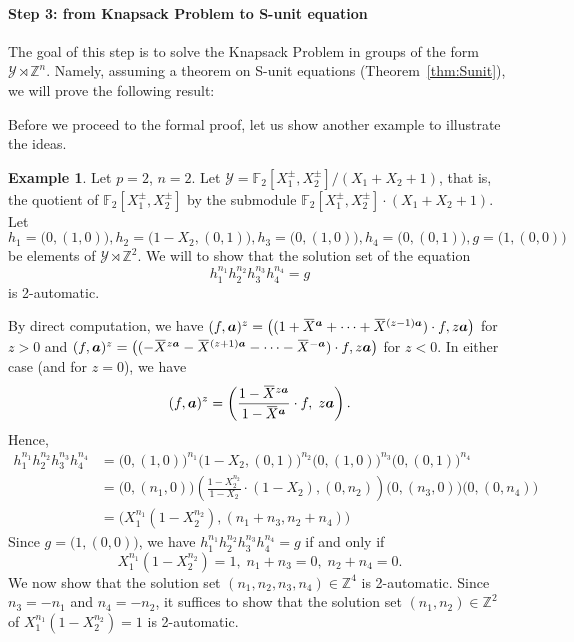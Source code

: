 \documentclass[a4paper,UKenglish,cleveref, autoref, thm-restate]{lipics-v2021}
\newcommand{\Z}{\mathbb{Z}}
\newcommand{\F}{\mathbb{F}}
\newcommand{\mY}{\mathcal{Y}}
\newcommand{\ba}{\boldsymbol{a}}
\newcommand{\oX}{\mkern 1.5mu\overline{\mkern-1.5mu X \mkern-1.5mu}\mkern 1.5mu}
\theoremstyle{definition}
\theoremstyle{definition}
\newtheorem{exmpl}[thrm]{Example}
\theoremstyle{definition}
\begin{document}
\paragraph*{Step 3: from Knapsack Problem to S-unit equation}

The goal of this step is to solve the Knapsack Problem in groups of the form $\mY \rtimes \Z^n$. Namely, assuming a theorem on S-unit equations (Theorem~\ref{thm:Sunit}), we will prove the following result:

\thmKP*

Before we proceed to the formal proof, let us show another example to illustrate the ideas. 

\begin{exmpl}\label{expl:KPtoSunit}
    Let $p = 2$, $n = 2$.
    Let $\mY = \F_2[X_1^{\pm}, X_2^{\pm}]/(X_1+X_2+1)$, that is, the quotient of $\F_2[X_1^{\pm}, X_2^{\pm}]$ by the submodule $\F_2[X_1^{\pm}, X_2^{\pm}] \cdot (X_1+X_2+1)$.    
    Let $h_1 = \big(0, (1, 0)\big), h_2 = \big(1 - X_2, (0, 1)\big), h_3 = \big(0, (1, 0)\big), h_4 = \big(0, (0, 1)\big), g = \big(1, (0, 0)\big)$ be elements of $\mY \rtimes \Z^2$. We will to show that the solution set of the equation
    \begin{equation}\label{eq:exampleKP}
        h_1^{n_1} h_2^{n_2} h_3^{n_3} h_4^{n_4} = g
    \end{equation}
    is 2-automatic.

    By direct computation, we have $(f, \ba)^z = \big((1 + \oX^{\ba} + \cdots + \oX^{(z-1) \ba}) \cdot f, z \ba\big)$ for $z > 0$ and $(f, \ba)^z = \big((- \oX^{z \ba} - \oX^{(z+1) \ba} - \cdots - \oX^{-\ba}) \cdot f, z \ba\big)$ for $z < 0$.
    In either case (and for $z = 0$), we have
    \[
    (f, \ba)^z = \left( \frac{1 - \oX^{z \ba}}{1 - \oX^{\ba}} \cdot f, \; z \ba \right).
    \]
    Hence,
    \begin{align*}
        h_1^{n_1} h_2^{n_2} h_3^{n_3} h_4^{n_4} & = \big(0, (1, 0)\big)^{n_1} \big(1 - X_2, (0, 1)\big)^{n_2} \big(0, (1, 0)\big)^{n_3} \big(0, (0, 1)\big)^{n_4} \\
        & = \big(0, (n_1, 0)\big) \left(\frac{1 - X_2^{n_2}}{1 - X_2} \cdot (1 - X_2), (0, n_2) \right) \big(0, (n_3, 0)\big) \big(0, (0, n_4)\big) \\
        & = \big(X_1^{n_1} (1 - X_2^{n_2}), (n_1 + n_3, n_2 + n_4) \big)
    \end{align*}
    Since $g = \big(1, (0, 0)\big)$, we have $h_1^{n_1} h_2^{n_2} h_3^{n_3} h_4^{n_4} = g$ if and only if
    \[
    X_1^{n_1} (1 - X_2^{n_2}) = 1, \; n_1 + n_3 = 0, \; n_2 + n_4 = 0.
    \]
    We now show that the solution set $(n_1, n_2, n_3, n_4) \in \Z^4$ is 2-automatic. Since $n_3 = - n_1$ and $n_4 = - n_2$, it suffices to show that the solution set $(n_1, n_2) \in \Z^2$ of $X_1^{n_1} (1 - X_2^{n_2}) = 1$ is 2-automatic.


\end{exmpl}
\end{document}
